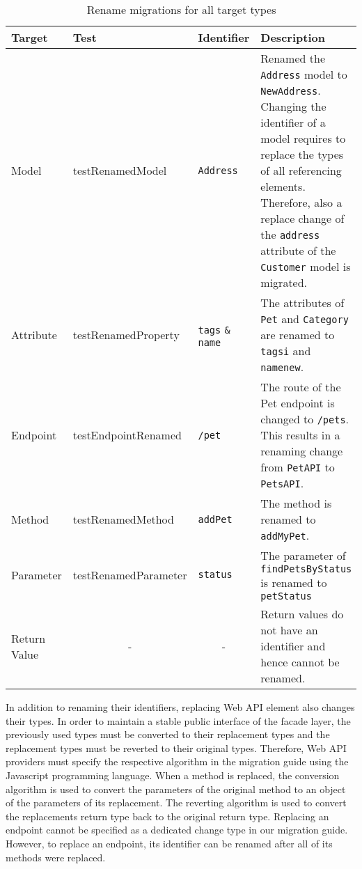 \begin{table}[!ht]
	\begin{center}
		\begin{tabular}{@{}lp{}lp{}@{}}
			\toprule
		\textbf{Target} & \textbf{Test} & \textbf{Identifier} & \textbf{Description} \\ \midrule
			Model           &   test\-Renamed\-Model  &    \texttt{Address}     &   Renamed the \texttt{Address} model to \texttt{NewAddress}. Changing the identifier of a model requires to replace the types of all referencing elements. Therefore, also a replace change of the \texttt{address} attribute of the \texttt{Customer} model is migrated.    \\
			Attribute       &   test\-Renamed\-Property   &  \texttt{tags} \texttt{\&} \texttt{name}      &      The attributes of  \texttt{Pet} and \texttt{Category} are renamed to \texttt{tagsi} and \texttt{namenew}.    \\
			Endpoint        &     test\-Endpoint\-Renamed  &    \texttt{/pet}     &   The route of the Pet endpoint is changed to \texttt{/pets}. This results in a renaming change from \texttt{PetAPI} to \texttt{PetsAPI}.     \\
			Method        &     test\-Renamed\-Method     &    \texttt{addPet}    &           The method is renamed to \texttt{addMyPet}.                            \\
			Parameter       &               test\-Renamed\-Parameter                    &    \texttt{status}       &       The parameter of \texttt{findPetsByStatus}  is renamed to \texttt{petStatus}        \\
			Return Value    &            \multicolumn{1}{c}{-}  &    \multicolumn{1}{c}{-}                   &      Return values do not have an identifier and hence cannot be renamed.         \\ \bottomrule
		\end{tabular}
		\caption{Rename migrations for all target types}
		\label{tab:RenameMigrationTests}
	\end{center}
\end{table}
\vspace{-0.5cm}
In addition to renaming their identifiers, replacing Web API element also changes their types. In order to maintain a stable public interface of the facade layer, the previously used types must be converted to their replacement types and the replacement types must be reverted to their original types. Therefore, Web API providers must specify the respective algorithm in the migration guide using the Javascript programming language. When a method is replaced, the conversion algorithm is used to convert the parameters of the original method to an object of the parameters of its replacement. The reverting algorithm is used to convert the replacements return type back to the original return type. Replacing an endpoint cannot be specified as a dedicated change type in our migration guide. However, to replace an endpoint, its identifier can be renamed after all of its methods were replaced.


